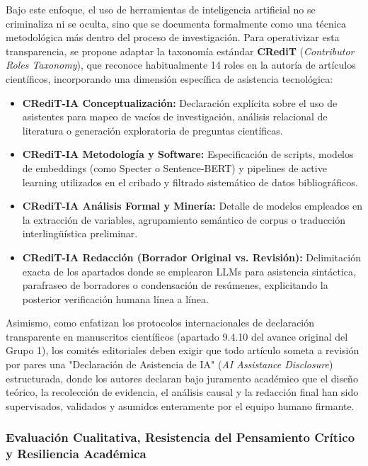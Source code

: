 Bajo este enfoque, el uso de herramientas de inteligencia artificial no se criminaliza ni se oculta, sino que se documenta formalmente como una técnica metodológica más dentro del proceso de investigación. Para operativizar esta transparencia, se propone adaptar la taxonomía estándar \textbf{CRediT} (\textit{Contributor Roles Taxonomy}), que reconoce habitualmente 14 roles en la autoría de artículos científicos, incorporando una dimensión específica de asistencia tecnológica:
\begin{itemize}
    \item \textbf{CRediT-IA Conceptualización:} Declaración explícita sobre el uso de asistentes para mapeo de vacíos de investigación, análisis relacional de literatura o generación exploratoria de preguntas científicas.
    \item \textbf{CRediT-IA Metodología y Software:} Especificación de scripts, modelos de embeddings (como Specter o Sentence-BERT) y pipelines de active learning utilizados en el cribado y filtrado sistemático de datos bibliográficos.
    \item \textbf{CRediT-IA Análisis Formal y Minería:} Detalle de modelos empleados en la extracción de variables, agrupamiento semántico de corpus o traducción interlingüística preliminar.
    \item \textbf{CRediT-IA Redacción (Borrador Original vs. Revisión):} Delimitación exacta de los apartados donde se emplearon LLMs para asistencia sintáctica, parafraseo de borradores o condensación de resúmenes, explicitando la posterior verificación humana línea a línea.
\end{itemize}

Asimismo, como enfatizan los protocolos internacionales de declaración transparente en manuscritos científicos (apartado 9.4.10 del avance original del Grupo 1), los comités editoriales deben exigir que todo artículo someta a revisión por pares una "Declaración de Asistencia de IA" (\textit{AI Assistance Disclosure}) estructurada, donde los autores declaran bajo juramento académico que el diseño teórico, la recolección de evidencia, el análisis causal y la redacción final han sido supervisados, validados y asumidos enteramente por el equipo humano firmante.

\subsubsection{Evaluación Cualitativa, Resistencia del Pensamiento Crítico y Resiliencia Académica}

